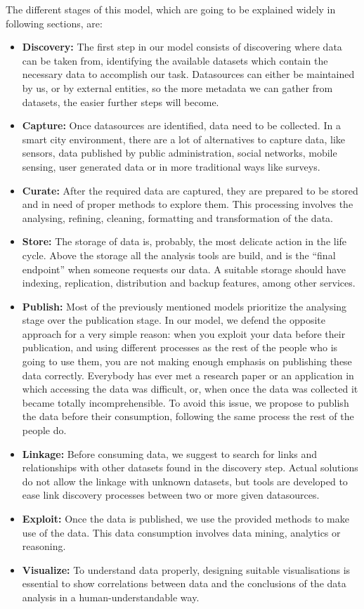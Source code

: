 The different stages of this model, which are going to be explained widely in following sections, are:
\begin{itemize}
	\item \textbf{Discovery:} The first step in our model consists of discovering where data can be taken from, identifying the available datasets which contain the necessary data to accomplish our task. Datasources can either be maintained by us, or by external entities, so the more metadata we can gather from datasets, the easier further steps will become.
    \item \textbf{Capture:} Once datasources are identified, data need to be collected. In a smart city environment, there are a lot of alternatives to capture data, like sensors, data published by public administration, social networks, mobile sensing, user generated data or in more traditional ways like surveys.
    \item \textbf{Curate:} After the required data are captured, they are prepared to be stored and in need of proper methods to explore them. This processing involves the analysing, refining, cleaning, formatting and transformation of the data.
    \item \textbf{Store:} The storage of data is, probably, the most delicate action in the life cycle. Above the storage  all the analysis tools are build, and is the ``final endpoint'' when someone requests our data. A suitable storage should have indexing, replication, distribution and backup features, among other services.
    \item \textbf{Publish:} Most of the previously mentioned models prioritize the analysing stage over the publication stage. In our model, we defend the opposite approach for a very simple reason: when you exploit your data before their publication, and using different processes as the rest of the people who is going to use them, you are not making enough emphasis on publishing these data correctly. Everybody has ever met a research paper or an application in which accessing the data was difficult, or, when once the data was collected it became totally incomprehensible. To avoid this issue, we propose to publish the data before their consumption, following the same process the rest of the people do.
    \item \textbf{Linkage:} Before consuming data, we suggest to search for links and relationships with other datasets found in the discovery step. Actual solutions do not allow the linkage with unknown datasets, but tools are developed to ease link discovery processes between two or more given datasources.
    \item \textbf{Exploit:} Once the data is published, we use the provided methods to make use of the data. This data consumption involves data mining, analytics or reasoning.
    \item \textbf{Visualize:} To understand data properly, designing suitable visualisations is essential to show correlations between data and the conclusions of the data analysis in a human-understandable way.

\end{itemize}

